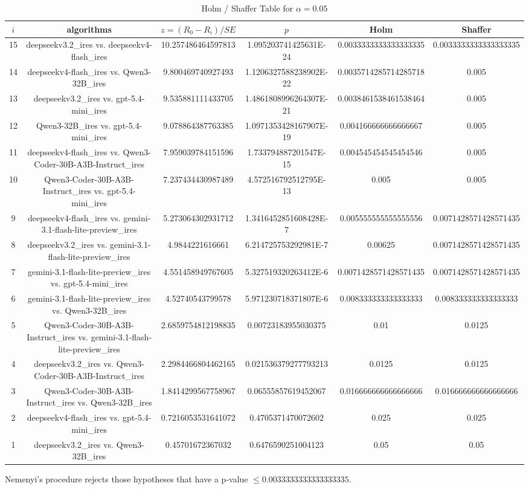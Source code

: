 \documentclass[a4paper,10pt]{article}
\begin{document}
\begin{landscape}
\begin{table}[!htp]
\centering\tiny
\caption{Holm / Shaffer Table for $\alpha=0.05$}
\begin{tabular}{cccccc}
$i$&algorithms&$z=(R_0 - R_i)/SE$&$p$&Holm&Shaffer\\
\hline
15&deepseekv3.2_ires vs. deepseekv4-flash_ires&10.257486464597813&1.095203741425631E-24&0.0033333333333333335&0.0033333333333333335\\14&deepseekv4-flash_ires vs. Qwen3-32B_ires&9.800469740927493&1.1206327588238902E-22&0.0035714285714285718&0.005\\13&deepseekv3.2_ires vs. gpt-5.4-mini_ires&9.535881111433705&1.4861808996264307E-21&0.0038461538461538464&0.005\\12&Qwen3-32B_ires vs. gpt-5.4-mini_ires&9.078864387763385&1.0971353428167907E-19&0.004166666666666667&0.005\\11&deepseekv4-flash_ires vs. Qwen3-Coder-30B-A3B-Instruct_ires&7.959039784151596&1.733794887201547E-15&0.004545454545454546&0.005\\10&Qwen3-Coder-30B-A3B-Instruct_ires vs. gpt-5.4-mini_ires&7.237434430987489&4.572516792512795E-13&0.005&0.005\\9&deepseekv4-flash_ires vs. gemini-3.1-flash-lite-preview_ires&5.273064302931712&1.3416452851608428E-7&0.005555555555555556&0.0071428571428571435\\8&deepseekv3.2_ires vs. gemini-3.1-flash-lite-preview_ires&4.9844221616661&6.214725753292981E-7&0.00625&0.0071428571428571435\\7&gemini-3.1-flash-lite-preview_ires vs. gpt-5.4-mini_ires&4.551458949767605&5.327519320263412E-6&0.0071428571428571435&0.0071428571428571435\\6&gemini-3.1-flash-lite-preview_ires vs. Qwen3-32B_ires&4.52740543799578&5.971230718371807E-6&0.008333333333333333&0.008333333333333333\\5&Qwen3-Coder-30B-A3B-Instruct_ires vs. gemini-3.1-flash-lite-preview_ires&2.6859754812198835&0.00723183955030375&0.01&0.0125\\4&deepseekv3.2_ires vs. Qwen3-Coder-30B-A3B-Instruct_ires&2.2984466804462165&0.021536379277793213&0.0125&0.0125\\3&Qwen3-Coder-30B-A3B-Instruct_ires vs. Qwen3-32B_ires&1.8414299567758967&0.06555857619452067&0.016666666666666666&0.016666666666666666\\2&deepseekv4-flash_ires vs. gpt-5.4-mini_ires&0.7216053531641072&0.4705371470072602&0.025&0.025\\1&deepseekv3.2_ires vs. Qwen3-32B_ires&0.45701672367032&0.6476590251004123&0.05&0.05\\\hline
\end{tabular}
\end{table}
Nemenyi's procedure rejects those hypotheses that have a p-value $\le0.0033333333333333335$.



\end{landscape}
\end{document}
